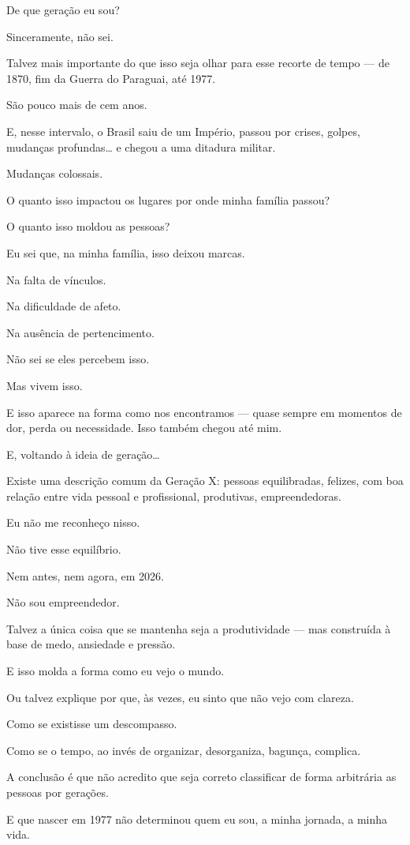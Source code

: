 De que geração eu sou?

Sinceramente, não sei.

Talvez mais importante do que isso seja olhar para esse recorte de tempo — de 1870, fim da Guerra do Paraguai, até 1977.

São pouco mais de cem anos.

E, nesse intervalo, o Brasil saiu de um Império, passou por crises, golpes, mudanças profundas… e chegou a uma ditadura militar.

Mudanças colossais.

O quanto isso impactou os lugares por onde minha família passou?

O quanto isso moldou as pessoas?

Eu sei que, na minha família, isso deixou marcas.

Na falta de vínculos.

Na dificuldade de afeto.

Na ausência de pertencimento.

Não sei se eles percebem isso.

Mas vivem isso.

E isso aparece na forma como nos encontramos — quase sempre em momentos de dor, perda ou necessidade.
Isso também chegou até mim.

E, voltando à ideia de geração…

Existe uma descrição comum da Geração X: pessoas equilibradas, felizes, com boa relação entre vida pessoal e profissional, produtivas, empreendedoras.

Eu não me reconheço nisso.

Não tive esse equilíbrio.

Nem antes, nem agora, em 2026.

Não sou empreendedor.

Talvez a única coisa que se mantenha seja a produtividade — mas construída à base de medo, ansiedade e pressão.

E isso molda a forma como eu vejo o mundo.

Ou talvez explique por que, às vezes, eu sinto que não vejo com clareza.

Como se existisse um descompasso.

Como se o tempo, ao invés de organizar, desorganiza, bagunça, complica.

A conclusão é que não acredito que seja correto classificar de forma arbitrária as pessoas por gerações.

E que nascer em 1977 não determinou quem eu sou, a minha jornada, a minha vida.
